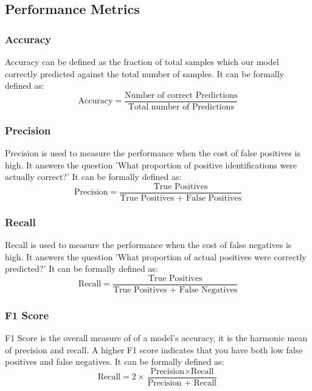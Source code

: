 \documentclass[fleqn,usenatbib]{mnras}
\begin{document}
\subsection{Performance Metrics}
\subsubsection{Accuracy}
\hspace*{0.25 in} Accuracy can be defined as the fraction of total samples which our model correctly predicted against the total number of samples. It can be formally defined as:
\begin{equation}
\text{Accuracy} = \frac{\text{Number of correct Predictions}}{\text{Total number of Predictions}}
\end{equation}

\subsubsection{Precision}
\hspace*{0.25 in} Precision is used to measure the performance when the cost of false positives is high. It answers the question 'What proportion of positive identifications were actually correct?' It can be formally defined as: 
\begin{equation}
\text{Precision} = \frac{\text{True Positives}}{\text{True Positives + False Positives}}
\end{equation}

\subsubsection{Recall}
\hspace*{0.25 in} Recall is used to measure the performance when the cost of false negatives is high.  It answers the question 'What proportion of actual positives were correctly predicted?' It can be formally defined as: 
\begin{equation}
\text{Recall} = \frac{\text{True Positives}}{\text{True Positives + False Negatives}}
\end{equation}

\subsubsection{F1 Score}
\hspace*{0.25 in} F1 Score is the overall measure of of a model's accuracy, it is the harmonic mean of precision and recall. A higher F1 score indicates that you have both low false positives and false negatives. It can be formally defined as: 
\begin{equation}
\text{Recall} = 2\times \frac{\text{Precision} \times \text{Recall}}{\text{Precision + Recall}}
\end{equation}
\end{document}
